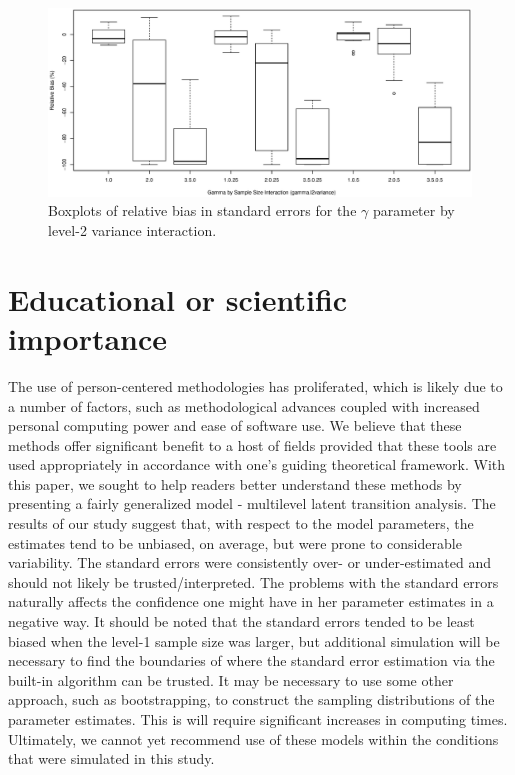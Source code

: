 \documentclass[man]{apa6}
\begin{document}
\begin{figure}[ht]
\centering
\includegraphics[scale=.5]{gammabyalpha2.eps}
\caption{Boxplots of relative bias in standard errors for the $\gamma$ parameter by level-2 variance interaction.}\label{fig:gammabyalpha2}
\end{figure}


\section*{Educational or scientific importance }
The use of person-centered methodologies has proliferated, which is likely due to a number of factors, such as methodological advances coupled with increased personal computing power and ease of software use. We believe that these methods offer significant benefit to a host of fields provided that these tools are used appropriately in accordance with one's guiding theoretical framework. With this paper, we sought to help readers better understand these methods by presenting a fairly generalized model - multilevel latent transition analysis. The results of our study suggest that, with respect to the model parameters, the estimates tend to be unbiased, on average, but were prone to considerable variability. The standard errors were consistently over- or under-estimated and should not likely be trusted/interpreted. The problems with the standard errors naturally affects the confidence one might have in her parameter estimates in a negative way. It should be noted that the standard errors tended to be least biased when the level-1 sample size was larger, but additional simulation will be necessary to find the boundaries of where the standard error estimation via the built-in algorithm can be trusted. It may be necessary to use some other approach, such as bootstrapping, to construct the sampling distributions of the parameter estimates. This is will require significant increases in computing times. Ultimately, we cannot yet recommend use of these models within the conditions that were simulated in this study.



\end{document}

